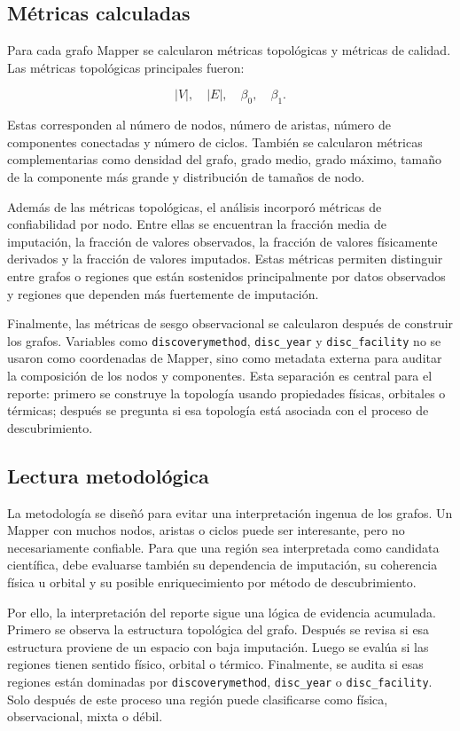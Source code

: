 \subsection*{Métricas calculadas}

Para cada grafo Mapper se calcularon métricas topológicas y métricas de calidad. Las métricas topológicas principales fueron:

\[
|V|,\quad |E|,\quad \beta_0,\quad \beta_1.
\]

Estas corresponden al número de nodos, número de aristas, número de componentes conectadas y número de ciclos. También se calcularon métricas complementarias como densidad del grafo, grado medio, grado máximo, tamaño de la componente más grande y distribución de tamaños de nodo.

Además de las métricas topológicas, el análisis incorporó métricas de confiabilidad por nodo. Entre ellas se encuentran la fracción media de imputación, la fracción de valores observados, la fracción de valores físicamente derivados y la fracción de valores imputados. Estas métricas permiten distinguir entre grafos o regiones que están sostenidos principalmente por datos observados y regiones que dependen más fuertemente de imputación.

Finalmente, las métricas de sesgo observacional se calcularon después de construir los grafos. Variables como \texttt{discoverymethod}, \texttt{disc\_year} y \texttt{disc\_facility} no se usaron como coordenadas de Mapper, sino como metadata externa para auditar la composición de los nodos y componentes. Esta separación es central para el reporte: primero se construye la topología usando propiedades físicas, orbitales o térmicas; después se pregunta si esa topología está asociada con el proceso de descubrimiento.

\subsection*{Lectura metodológica}

La metodología se diseñó para evitar una interpretación ingenua de los grafos. Un Mapper con muchos nodos, aristas o ciclos puede ser interesante, pero no necesariamente confiable. Para que una región sea interpretada como candidata científica, debe evaluarse también su dependencia de imputación, su coherencia física u orbital y su posible enriquecimiento por método de descubrimiento.

Por ello, la interpretación del reporte sigue una lógica de evidencia acumulada. Primero se observa la estructura topológica del grafo. Después se revisa si esa estructura proviene de un espacio con baja imputación. Luego se evalúa si las regiones tienen sentido físico, orbital o térmico. Finalmente, se audita si esas regiones están dominadas por \texttt{discoverymethod}, \texttt{disc\_year} o \texttt{disc\_facility}. Solo después de este proceso una región puede clasificarse como física, observacional, mixta o débil.